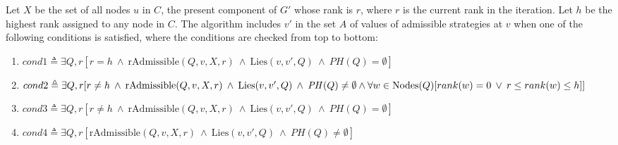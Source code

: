 Let $X$ be the set of all nodes $u$ in $C$, the present component of $G'$ whose rank is $r$, where $r$ is the current rank in the iteration. Let $h$ be the highest rank assigned to any node in $C$. The algorithm includes $v'$ in the set $A$ of values of admissible strategies at $v$ when one of the following conditions is satisfied, where the conditions are checked from top to bottom:
\begin{enumerate}
	\item $cond1 \triangleq \exists Q,r[r = h \: \wedge \: \mathrm{rAdmissible}(Q,v,X,r) \:  \wedge \: \mathrm{Lies}(v,v',Q) \: \wedge \: \mathrm{\mathit{PH}}(Q) = \emptyset]$
	\item $cond2 \triangleq \exists Q,r[r \neq h \: \wedge \: \mathrm{rAdmissible}(Q,v,X,r) \:  \wedge \: \mathrm{Lies}(v,v',Q) \: \wedge \: \mathrm{\mathit{PH}}(Q) \neq \emptyset \newline
	\wedge \forall w \in \mathrm{Nodes}(Q)[rank(w) = 0 \: \vee \: r \leq rank(w) \leq h] ]$
	\item $cond3 \triangleq \exists Q,r[r \neq h \: \wedge \: \mathrm{rAdmissible}(Q,v,X,r) \: \wedge \: \mathrm{Lies}(v,v',Q) \: \wedge \: \mathrm{\mathit{PH}}(Q) = \emptyset]$  
	\item $cond4 \triangleq \exists Q,r[\mathrm{rAdmissible}(Q,v,X,r) \: \wedge \: \mathrm{Lies}(v,v',Q) \: \wedge \: \mathrm{\mathit{PH}}(Q) \neq \emptyset]$
\end{enumerate}

